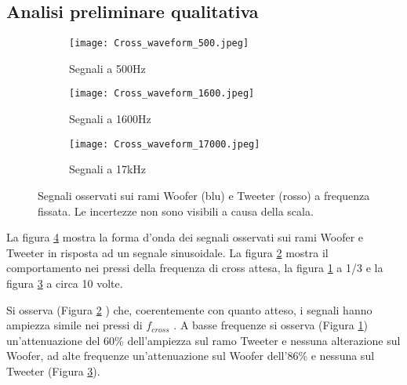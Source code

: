 \documentclass[../Relazione_circuiti]{subfiles}
\begin{document}
\subsection{Analisi preliminare qualitativa}

  \begin{figure}[H]
    \centering

    \begin{subfigure}[b]{0.3\textwidth}
      \centering
      \texttt{[image: Cross\_waveform\_500.jpeg]}

      \caption{Segnali a 500Hz}
      \label{fig:signal_500}

    \end{subfigure}

    \hfill

    \begin{subfigure}[b]{0.3\textwidth}
      \centering
      \texttt{[image: Cross\_waveform\_1600.jpeg]}

      \caption{Segnali a 1600Hz}
      \label{fig:signal_1600}

    \end{subfigure}

    \hfill

    \begin{subfigure}[b]{0.3\textwidth}
      \centering
      \texttt{[image: Cross\_waveform\_17000.jpeg]}

      \caption{Segnali a 17kHz}
      \label{fig:signal_17k}

    \end{subfigure}

    \caption{Segnali osservati sui rami Woofer (blu) e Tweeter (rosso)
      a frequenza fissata. Le incertezze non sono visibili a causa della scala.}
    \label{fig:signal_waveforms}

  \end{figure}

  La figura \ref{fig:signal_waveforms}
      mostra la forma d'onda dei segnali osservati sui rami Woofer e Tweeter in risposta ad un segnale sinusoidale. La
      figura \ref{fig:signal_1600} mostra il comportamento nei pressi della frequenza di cross attesa, la figura
      \ref{fig:signal_500} a 1/3 e la figura \ref{fig:signal_17k} a circa 10 volte.

  Si osserva (Figura \ref{fig:signal_1600}
      ) che, coerentemente con quanto atteso, i segnali hanno ampiezza simile nei pressi di $f_{cross}$
      . A basse frequenze si osserva (Figura \ref{fig:signal_500}) un'attenuazione del 60\%
      dell'ampiezza sul ramo Tweeter e nessuna alterazione sul Woofer, ad alte frequenze un'attenuazione sul Woofer
      dell'86\% e nessuna sul Tweeter (Figura \ref{fig:signal_17k}).
\end{document}
